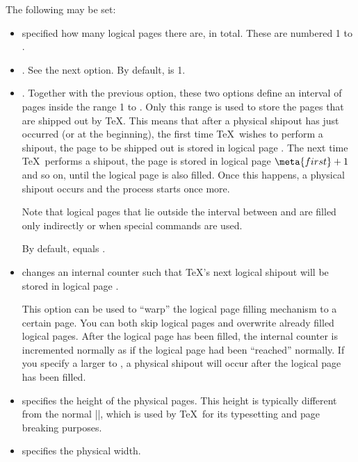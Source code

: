 \begin{command}{\pgfpagesphysicalpageoptions{}}
  The following  may be set:
  \begin{itemize}
    \item {} specified how many
    logical pages there are, in total. These are numbered 1 to
    .
    \item {}. See the
      next option. By default,  is 1.
    \item {}. Together
    with the previous option, these two options define an interval of
    pages inside the range 1 to . Only this range
    is used to store the pages that are shipped out by \TeX. This
    means that after a physical shipout has just occurred (or at the
    beginning), the first time \TeX\ wishes to perform a shipout, the
    page to be shipped out is stored in logical page . The
    next time \TeX\ performs a shipout, the page is stored in logical
    page $\meta{first} +1$ and so on, until the logical page
     is also filled. Once this happens, a physical shipout
    occurs and the process starts once more.

    Note that logical pages that lie outside the interval between
     and  are filled only indirectly or when
    special commands are used.

    By default,  equals .
  \item {} changes
    an internal counter such that \TeX's next logical shipout will be
    stored in logical page .

    This option can be used to ``warp'' the logical page filling
    mechanism to a certain page. You can both skip logical pages and
    overwrite already filled logical pages. After the logical page
     has been filled, the internal counter is
    incremented normally as if the logical page  had
    been ``reached'' normally. If you specify a  larger
    to , a physical shipout will occur after the logical
    page  has been filled.
  \item
    specifies the height of the physical pages. This height is
    typically different from the normal  |\paperheight|, which is used
    by \TeX\ for its typesetting and page breaking purposes.
  \item
    specifies the physical width.
  \end{itemize}
\end{command}


